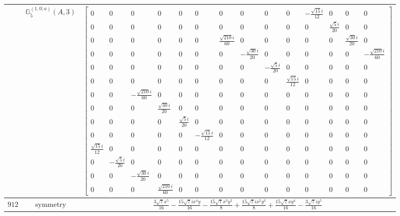 \documentclass[fleqn,8pt,landscape]{jsarticle}
\begin{document}
\begin{longtable}{ccc}
$  $ & $ \mathbb{G}_{5}^{(1,0;a)}(A,3) $ & $ \begin{bmatrix} 0 & 0 & 0 & 0 & 0 & 0 & 0 & 0 & 0 & 0 & - \frac{\sqrt{15} i}{12} & 0 & 0 & 0 \\ 0 & 0 & 0 & 0 & 0 & 0 & 0 & 0 & 0 & 0 & 0 & \frac{\sqrt{5} i}{20} & 0 & 0 \\ 0 & 0 & 0 & 0 & 0 & 0 & \frac{\sqrt{210} i}{60} & 0 & 0 & 0 & 0 & 0 & \frac{\sqrt{30} i}{20} & 0 \\ 0 & 0 & 0 & 0 & 0 & 0 & 0 & - \frac{\sqrt{30} i}{20} & 0 & 0 & 0 & 0 & 0 & - \frac{\sqrt{210} i}{60} \\ 0 & 0 & 0 & 0 & 0 & 0 & 0 & 0 & - \frac{\sqrt{5} i}{20} & 0 & 0 & 0 & 0 & 0 \\ 0 & 0 & 0 & 0 & 0 & 0 & 0 & 0 & 0 & \frac{\sqrt{15} i}{12} & 0 & 0 & 0 & 0 \\ 0 & 0 & - \frac{\sqrt{210} i}{60} & 0 & 0 & 0 & 0 & 0 & 0 & 0 & 0 & 0 & 0 & 0 \\ 0 & 0 & 0 & \frac{\sqrt{30} i}{20} & 0 & 0 & 0 & 0 & 0 & 0 & 0 & 0 & 0 & 0 \\ 0 & 0 & 0 & 0 & \frac{\sqrt{5} i}{20} & 0 & 0 & 0 & 0 & 0 & 0 & 0 & 0 & 0 \\ 0 & 0 & 0 & 0 & 0 & - \frac{\sqrt{15} i}{12} & 0 & 0 & 0 & 0 & 0 & 0 & 0 & 0 \\ \frac{\sqrt{15} i}{12} & 0 & 0 & 0 & 0 & 0 & 0 & 0 & 0 & 0 & 0 & 0 & 0 & 0 \\ 0 & - \frac{\sqrt{5} i}{20} & 0 & 0 & 0 & 0 & 0 & 0 & 0 & 0 & 0 & 0 & 0 & 0 \\ 0 & 0 & - \frac{\sqrt{30} i}{20} & 0 & 0 & 0 & 0 & 0 & 0 & 0 & 0 & 0 & 0 & 0 \\ 0 & 0 & 0 & \frac{\sqrt{210} i}{60} & 0 & 0 & 0 & 0 & 0 & 0 & 0 & 0 & 0 & 0 \end{bmatrix} $ \\ \hline
$ 912 $ & $ \text{symmetry} $ & $ \frac{3 \sqrt{7} x^{5}}{16} - \frac{15 \sqrt{7} i x^{4} y}{16} - \frac{15 \sqrt{7} x^{3} y^{2}}{8} + \frac{15 \sqrt{7} i x^{2} y^{3}}{8} + \frac{15 \sqrt{7} x y^{4}}{16} - \frac{3 \sqrt{7} i y^{5}}{16} $ \\

\end{longtable}
\end{document}
